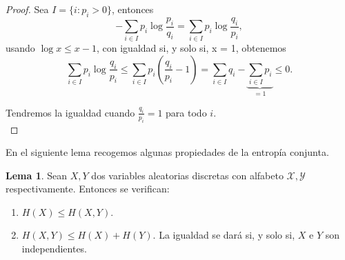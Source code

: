 \documentclass[12pt,a4paper]{report} %
\theoremstyle{definition}
\newtheorem{lemma}[theorem]{Lema}
\begin{document}
\begin{proof}
  Sea $I = \{i : p_i > 0\}$, entonces\[
- \sum_{i \in I} p_i \log \frac{p_i}{q_i} = \sum_{i \in I} p_i \log \frac{q_i}{p_i},
  \]
  usando $\log x \le x - 1$, con igualdad si, y solo si, x = 1, obtenemos\[
  \sum_{i \in I} p_i \log \frac{q_i}{p_i} \leq
  \sum_{i\in I}p_i \left ( \frac{q_i}{p_i} - 1 \right )
  = \sum_{i\in I}q_i - \underbrace{\sum_{i \in I}p_i}_{= 1} \leq 0.\]

  Tendremos la igualdad cuando $\frac{q_i}{p_i} = 1$ para todo $i$.\\
\end{proof}

En el siguiente lema recogemos algunas propiedades de la entropía conjunta.\\

\begin{lemma}\label{l:prop_ent_conj} Sean $X, Y$ dos variables aleatorias discretas con alfabeto $\mathcal{X}, \mathcal{Y}$ respectivamente. Entonces se verifican:
  \begin{enumerate}
  \item $H(X) \le H(X, Y)$.
  \item $H(X,Y) \le H(X) + H(Y)$. La igualdad se dará si, y solo si, $X$ e $Y$ son independientes.
  \end{enumerate}
\end{lemma}
\end{document}
